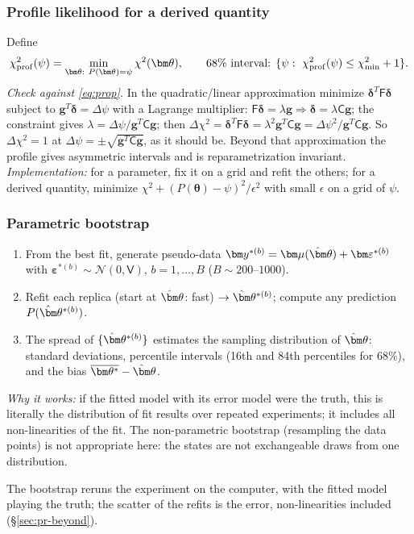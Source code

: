 \documentclass[11pt,a4paper]{article}
\numberwithin{equation}{section}
\theoremstyle{definition}
\theoremstyle{plain}
\theoremstyle{remark}
\newenvironment{plainwords}[1][In plain words]{\begin{tcolorbox}[plainbox,title={\small\bfseries #1},fonttitle=\small,coltitle=white,colbacktitle=ForestGreen!60!black]}{\end{tcolorbox}}
\numberwithin{algorithm}{section}
\newcommand{\sV}{\mathsf V}
\newcommand{\sF}{\mathsf F}
\newcommand{\sC}{\mathsf C}
\newcommand{\vth}{\bm\theta}
\newcommand{\vg}{\bm g}
\begin{document}
\subsubsection{Profile likelihood for a derived quantity}
Define
\begin{equation}
\chi^2_{\rm prof}(\psi)=\min_{\vth:\ P(\vth)=\psi}\chi^2(\vth),\qquad \text{68\% interval: }\{\psi:\ \chi^2_{\rm prof}(\psi)\le\chi^2_{\min}+1\}.
\end{equation}
\emph{Check against \eqref{eq:prop}.} In the quadratic/linear approximation minimize $\bm\delta^T\sF\bm\delta$ subject to $\vg^T\bm\delta=\Delta\psi$ with a Lagrange multiplier: $\sF\bm\delta=\lambda\vg\Rightarrow\bm\delta=\lambda\sC\vg$; the constraint gives $\lambda=\Delta\psi/\vg^T\sC\vg$; then $\Delta\chi^2=\bm\delta^T\sF\bm\delta=\lambda^2\vg^T\sC\vg=\Delta\psi^2/\vg^T\sC\vg$. So $\Delta\chi^2=1$ at $\Delta\psi=\pm\sqrt{\vg^T\sC\vg}$, as it should be. Beyond that approximation the profile gives asymmetric intervals and is reparametrization invariant.
\emph{Implementation:} for a parameter, fix it on a grid and refit the others; for a derived quantity, minimize $\chi^2+(P(\vth)-\psi)^2/\epsilon^2$ with small $\epsilon$ on a grid of $\psi$.

\subsubsection{Parametric bootstrap}
\begin{enumerate}[leftmargin=1.5em,itemsep=2pt]
\item From the best fit, generate pseudo-data $\bm y^{*(b)}=\bm\mu(\hat\vth)+\bm\varepsilon^{*(b)}$ with $\bm\varepsilon^{*(b)}\sim\mathcal N(0,\sV)$, $b=1,\dots,B$ ($B\sim200$--$1000$).
\item Refit each replica (start at $\hat\vth$: fast) $\to\hat\vth^{*(b)}$; compute any prediction $P(\hat\vth^{*(b)})$.
\item The spread of $\{\hat\vth^{*(b)}\}$ estimates the sampling distribution of $\hat\vth$: standard deviations, percentile intervals (16th and 84th percentiles for $68\%$), and the bias $\overline{\vth^*}-\hat\vth$.
\end{enumerate}
\emph{Why it works:} if the fitted model with its error model were the truth, this is literally the distribution of fit results over repeated experiments; it includes all non-linearities of the fit. The non-parametric bootstrap (resampling the data points) is not appropriate here: the states are not exchangeable draws from one distribution.
\begin{plainwords}[In plain words]
The bootstrap reruns the experiment on the computer, with the fitted model playing the truth; the scatter of the refits is the error, non-linearities included (\S\ref{sec:pr-beyond}).
\end{plainwords}
\end{document}
